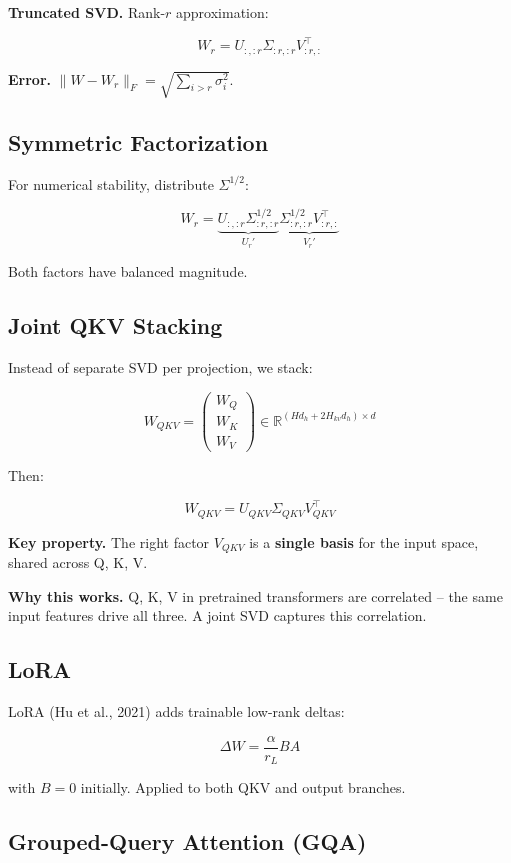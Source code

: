 \textbf{Truncated SVD.} Rank-$r$ approximation:

\[
W_r = U_{:, :r} \Sigma_{:r, :r} V_{:r, :}^\top
\]

\textbf{Error.} $\|W - W_r\|_F = \sqrt{\sum_{i > r} \sigma_i^2}$.

\subsection{Symmetric Factorization}

For numerical stability, distribute $\Sigma^{1/2}$:

\[
W_r = \underbrace{U_{:, :r} \Sigma_{:r, :r}^{1/2}}_{U_r'} \underbrace{\Sigma_{:r, :r}^{1/2} V_{:r, :}^\top}_{V_r'}
\]

Both factors have balanced magnitude.

\subsection{Joint QKV Stacking}

Instead of separate SVD per projection, we stack:

\[
W_{QKV} = \begin{pmatrix} W_Q \\ W_K \\ W_V \end{pmatrix} \in \mathbb{R}^{(H d_h + 2 H_{kv} d_h) \times d}
\]

Then:

\[
W_{QKV} = U_{QKV} \Sigma_{QKV} V_{QKV}^\top
\]

\textbf{Key property.} The right factor $V_{QKV}$ is a \textbf{single basis} for the 
input space, shared across Q, K, V.

\textbf{Why this works.} Q, K, V in pretrained transformers are correlated -- the 
same input features drive all three. A joint SVD captures this correlation.

\subsection{LoRA}

LoRA (Hu et al., 2021) adds trainable low-rank deltas:

\[
\Delta W = \frac{\alpha}{r_L} B A
\]

with $B = 0$ initially. Applied to both QKV and output branches.

\subsection{Grouped-Query Attention (GQA)}

